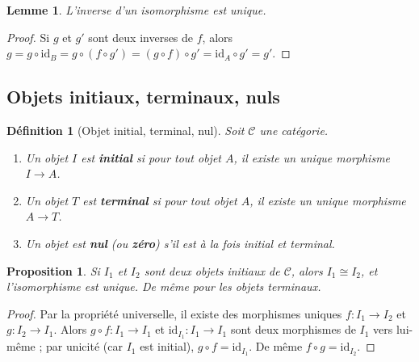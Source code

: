 \documentclass[a4paper,12pt]{book}
\newcommand{\id}{\mathrm{id}}
\newtheorem{proposition}[theoreme]{Proposition}
\newtheorem{lemme}[theoreme]{Lemme}
\newtheorem{definition}[theoreme]{Définition}
\begin{document}
\begin{lemme}\label{lem:unicite-inverse}
L'inverse d'un isomorphisme est unique.
\end{lemme}

\begin{proof}
Si $g$ et $g'$ sont deux inverses de $f$, alors $g = g \circ \id_B = g \circ (f \circ g') = (g \circ f) \circ g' = \id_A \circ g' = g'$.
\end{proof}

\subsection{Objets initiaux, terminaux, nuls}

\begin{definition}[Objet initial, terminal, nul]\label{def:init-term-nul}
Soit $\mathcal{C}$ une catégorie.
\begin{enumerate}[label=(\roman*)]
  \item Un objet $I$ est \textbf{initial} si pour tout objet $A$, il existe un unique morphisme $I \to A$.
  \item Un objet $T$ est \textbf{terminal} si pour tout objet $A$, il existe un unique morphisme $A \to T$.
  \item Un objet est \textbf{nul} (ou \textbf{zéro}) s'il est à la fois initial et terminal.
\end{enumerate}
\end{definition}

\begin{proposition}\label{prop:init-term-unique}
Si $I_1$ et $I_2$ sont deux objets initiaux de $\mathcal{C}$, alors $I_1 \cong I_2$, et l'isomorphisme est unique. De même pour les objets terminaux.
\end{proposition}

\begin{proof}
Par la propriété universelle, il existe des morphismes uniques $f : I_1 \to I_2$ et $g : I_2 \to I_1$. Alors $g \circ f : I_1 \to I_1$ et $\id_{I_1} : I_1 \to I_1$ sont deux morphismes de $I_1$ vers lui-même ; par unicité (car $I_1$ est initial), $g \circ f = \id_{I_1}$. De même $f \circ g = \id_{I_2}$.
\end{proof}
\end{document}
